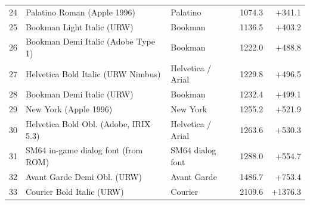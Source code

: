 \begin{tabular}{rllrr}
24 & Palatino Roman (Apple 1996) & Palatino & 1074.3 & +341.1 \\
25 & Bookman Light Italic (URW) & Bookman & 1136.5 & +403.2 \\
26 & Bookman Demi Italic (Adobe Type 1) & Bookman & 1222.0 & +488.8 \\
27 & Helvetica Bold Italic (URW Nimbus) & Helvetica / Arial & 1229.8 & +496.5 \\
28 & Bookman Demi Italic (URW) & Bookman & 1232.4 & +499.1 \\
29 & New York (Apple 1996) & New York & 1255.2 & +521.9 \\
30 & Helvetica Bold Obl. (Adobe, IRIX 5.3) & Helvetica / Arial & 1263.6 & +530.3 \\
31 & SM64 in-game dialog font (from ROM) & SM64 dialog font & 1288.0 & +554.7 \\
32 & Avant Garde Demi Obl. (URW) & Avant Garde & 1486.7 & +753.4 \\
33 & Courier Bold Italic (URW) & Courier & 2109.6 & +1376.3 \\
\bottomrule\end{tabular}
